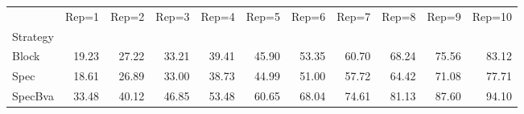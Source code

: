 \begin{tabular}{lrrrrrrrrrr}
\toprule
 & Rep=1 & Rep=2 & Rep=3 & Rep=4 & Rep=5 & Rep=6 & Rep=7 & Rep=8 & Rep=9 & Rep=10 \\
Strategy &  &  &  &  &  &  &  &  &  &  \\
\midrule
Block & 19.23 & 27.22 & 33.21 & 39.41 & 45.90 & 53.35 & 60.70 & 68.24 & 75.56 & 83.12 \\
Spec & 18.61 & 26.89 & 33.00 & 38.73 & 44.99 & 51.00 & 57.72 & 64.42 & 71.08 & 77.71 \\
SpecBva & 33.48 & 40.12 & 46.85 & 53.48 & 60.65 & 68.04 & 74.61 & 81.13 & 87.60 & 94.10 \\
\bottomrule
\end{tabular}
